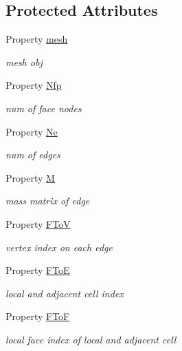 \subsection*{Protected Attributes}
\begin{DoxyCompactItemize}
\item 
Property \hyperlink{class_ndg_bottom_inner_edge3d_a19345b1da21dfbe0866a8b543ecbb5d4}{mesh}
\begin{DoxyCompactList}\small\item\em mesh obj \end{DoxyCompactList}\item 
Property \hyperlink{class_ndg_bottom_inner_edge3d_a2bfe5e170ef954a0879b3e2583ac333a}{Nfp}
\begin{DoxyCompactList}\small\item\em num of face nodes \end{DoxyCompactList}\item 
Property \hyperlink{class_ndg_bottom_inner_edge3d_a2eb2c2b8c2e14f3ac4c2043214283497}{Ne}
\begin{DoxyCompactList}\small\item\em num of edges \end{DoxyCompactList}\item 
Property \hyperlink{class_ndg_bottom_inner_edge3d_a7042aa7fea8dbdfe3a7f489a901a2b97}{M}
\begin{DoxyCompactList}\small\item\em mass matrix of edge \end{DoxyCompactList}\item 
Property \hyperlink{class_ndg_bottom_inner_edge3d_af4f162a19f7df4f65468b643dc4cb1d7}{F\+ToV}
\begin{DoxyCompactList}\small\item\em vertex index on each edge \end{DoxyCompactList}\item 
Property \hyperlink{class_ndg_bottom_inner_edge3d_a5a3003a8e7f479375b4eb0fca99129b0}{F\+ToE}
\begin{DoxyCompactList}\small\item\em local and adjacent cell index \end{DoxyCompactList}\item 
Property \hyperlink{class_ndg_bottom_inner_edge3d_a8531d58c728cc4e8dca60a72136a8cf0}{F\+ToF}
\begin{DoxyCompactList}\small\item\em local face index of local and adjacent cell \end{DoxyCompactList}\item 

\end{DoxyCompactItemize}
